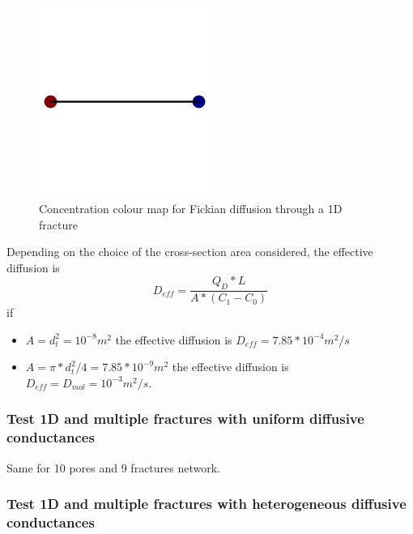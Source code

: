 \documentclass{article}
\begin{document}
\begin{figure}[h]
    \centering
    \includegraphics[width=0.5\textwidth]{images/fromOpenPNM/oneFractureSolution.png}
    \caption{Concentration colour map for Fickian diffusion through a 1D fracture}
    \label{fig:OneFractureSolution}
\end{figure}
Depending on the choice of the cross-section area considered, the effective diffusion is
\begin{equation}
    D_{eff}=\frac{Q_D*L}{A*(C_1-C_0)}
    \label{eq:EffDiff1Frac}
\end{equation}
if
\begin{itemize}
    \item $A=d_t^2=10^{-8} m^2$ the effective diffusion is $D_{eff}=7.85*10^{-4} m^2/s$
    \item $A=\pi*d_t^2/4=7.85*10^{-9} m^2$ the effective diffusion is $D_{eff}=D_{mol}=10^{-3} m^2/s$.
\end{itemize}

\FloatBarrier  %
\subsubsection{Test 1D and multiple fractures with uniform diffusive conductances}
Same for 10 pores and 9 fractures network.

\FloatBarrier  %
\subsubsection{Test 1D and multiple fractures with heterogeneous diffusive conductances}


\FloatBarrier  %
\end{document}
